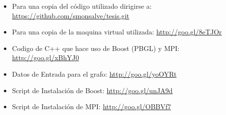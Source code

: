 
\begin{itemize}
	\item Para una copia del código utilizado dirigirse a: 
	\url{https://github.com/smonsalve/tesis.git}
	
	\item Para una copia de la maquina virtual utilizada:
	\url{http://goo.gl/8eTJOr}

	\item Codigo de C++ que hace uso de Boost (PBGL) y MPI:
	\url{http://goo.gl/xBhYJ0}

	\item Datos de Entrada para el grafo:
 	\url{http://goo.gl/yoOYRt}

	\item Script de Instalación de Boost:
	\url{http://goo.gl/unJA9d}

	\item Script de Instalación de MPI:
	\url{http://goo.gl/OBBVf7}

	
\end{itemize}








